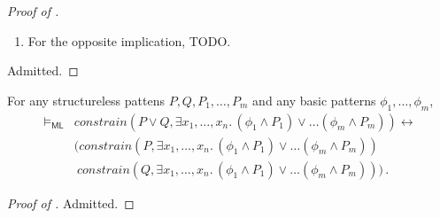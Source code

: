 \documentclass{article}
\newcommand{\ML}{\mathsf{ML}}
\newenvironment{proofenv}
  {
    \VerbatimEnvironment\begin{tcolorbox}[colback=black!0!white] %
  }
  {
   \end{tcolorbox}
  }
\begin{document}
\begin{proof}[Proof of ]
\begin{enumerate}
\begin{proofenv}
\begin{enumerate}
            \begin{equation*}
            (\mathcal{T}, c_j, \rho_2) \vDash  P_{j} \land P \, .
            \end{equation*}
        \end{enumerate}
    \end{proofenv}
    We prove these three subgoals one by one.
    \begin{enumerate}
        \item Let $v \in \mathit{Var} \setminus \vec{X}$. The by definition of $\rho_2(v)$, we have
        that $\rho_2(v) = \rho(v)$.
        \item By (ii.b), we have $(\mathcal{T}, c_j, \rho_2) \vDash \phi_j$,
        but we have to prove that for any $v \in \mathit{FV}(\mathit{mkList(\phi_{i_1}, \ldots, \phi_{i_k})})$,
        it holds that $\rho_2(v) = \rho_0(v)$,
        assuming that for any $v \in \mathit{Var}^* \setminus \vec{Z}$,
        we have $\rho_0(v) = \rho(v)$.
        In case $v \not\in \vec{X}$, then by definition of $\rho_2$, the goal reduces to
        $\rho(v) = \rho_0(v)$, which follows from the assumption since $\vec{X} \subseteq \vec{Z}$.
        In case $v \in \vec{X}$, the goal holds be definition of $\rho_2$.
        \item TODO
    \end{enumerate}
    \item For the opposite implication, TODO.
\end{enumerate}

Admitted.
\end{proof}



\begin{lemma}\label{lem:constrain}
  For any structureless pattens $P, Q, P_1, \ldots, P_m$
  and any basic patterns $\phi_1, \ldots, \phi_m$,
    \begin{align*}
        \vDash_\ML & \mathit{constrain}(P \lor Q, \exists x_1,\ldots,x_{n}.\, (\phi_1 \land P_1) \lor \ldots (\phi_m \land P_{m})) \leftrightarrow
        \\ & ( \mathit{constrain}(P, \exists x_1,\ldots,x_{n}.\, (\phi_1 \land P_1) \lor \ldots (\phi_m \land P_{m}))
        \\ & \ \mathit{constrain}(Q, \exists x_1,\ldots,x_{n}.\, (\phi_1 \land P_1) \lor \ldots (\phi_m \land P_{m})) ) \, .
    \end{align*}
\end{lemma}
\begin{proof}[Proof of ]
Admitted.
\end{proof}
\end{document}
